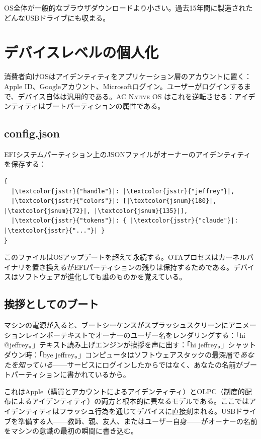\documentclass[10pt,letterpaper,twocolumn]{article}
\newcommand{\acos}{\textsc{AC Native OS}}
\begin{document}
OS全体が一般的なブラウザダウンロードより小さい。過去15年間に製造されたどんなUSBドライブにも収まる。


\section{デバイスレベルの個人化}
\label{sec:personalization}

消費者向けOSはアイデンティティをアプリケーション層のアカウントに置く：Apple ID、Googleアカウント、Microsoftログイン。ユーザーがログインするまで、デバイス自体は汎用的である。\acos{} はこれを逆転させる：アイデンティティはブートパーティションの属性である。

\subsection{config.json}

EFIシステムパーティション上のJSONファイルがオーナーのアイデンティティを保存する：

\begin{lstlisting}[style=acjsstyle]
{
  |\textcolor{jsstr}{"handle"}|: |\textcolor{jsstr}{"jeffrey"}|,
  |\textcolor{jsstr}{"colors"}|: [|\textcolor{jsnum}{180}|, |\textcolor{jsnum}{72}|, |\textcolor{jsnum}{135}|],
  |\textcolor{jsstr}{"tokens"}|: { |\textcolor{jsstr}{"claude"}|: |\textcolor{jsstr}{"..."}| }
}
\end{lstlisting}

このファイルはOSアップデートを超えて永続する。OTAプロセスはカーネルバイナリを置き換えるがEFIパーティションの残りは保持するためである。デバイスはソフトウェアが進化しても誰のものかを覚えている。

\subsection{挨拶としてのブート}

マシンの電源が入ると、ブートシーケンスがスプラッシュスクリーンにアニメーションレインボーテキストでオーナーのユーザー名をレンダリングする：「hi @jeffrey。」テキスト読み上げエンジンが挨拶を声に出す：「hi jeffrey。」シャットダウン時：「bye jeffrey。」コンピュータはソフトウェアスタックの最深層で\emph{あなたを知っている}——サービスにログインしたからではなく、あなたの名前がブートパーティションに書かれているから。

これはApple（購買とアカウントによるアイデンティティ）とOLPC（制度的配布によるアイデンティティ）の両方と根本的に異なるモデルである。ここではアイデンティティはフラッシュ行為を通じてデバイスに直接刻まれる。USBドライブを準備する人——教師、親、友人、またはユーザー自身——がオーナーの名前をマシンの意識の最初の瞬間に書き込む。
\end{document}
